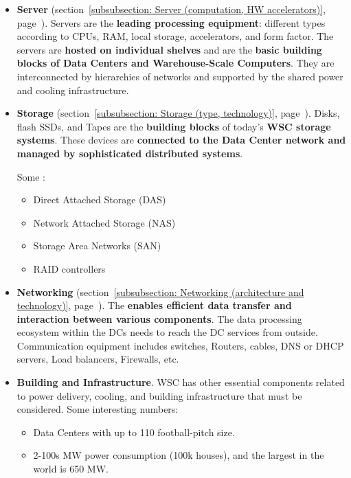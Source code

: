 \begin{itemize}
    \item \textbf{Server} (section~\ref{subsubsection: Server (computation, HW accelerators)}, page~\pageref{subsubsection: Server (computation, HW accelerators)}). Servers are the \textbf{leading processing equipment}: different types according to CPUs, RAM, local storage, accelerators, and form factor. The servers are \textbf{hosted on individual shelves} and are the \textbf{basic building blocks of Data Centers and Warehouse-Scale Computers}. They are interconnected by hierarchies of networks and supported by the shared power and cooling infrastructure.

    \item \textbf{Storage} (section~\ref{subsubsection: Storage (type, technology)}, page~\pageref{subsubsection: Storage (type, technology)}). Disks, flash SSDs, and Tapes are the \textbf{building blocks} of today's \textbf{WSC storage systems}. These devices are \textbf{connected to the Data Center network and managed by sophisticated distributed systems}.
    
    Some :
    \begin{itemize}
        \item Direct Attached Storage (DAS)

        \item Network Attached Storage (NAS)

        \item Storage Area Networks (SAN)

        \item RAID controllers
    \end{itemize}

    \item \textbf{Networking} (section~\ref{subsubsection: Networking (architecture and technology)}, page~\pageref{subsubsection: Networking (architecture and technology)}). The  \textbf{enables efficient data transfer and interaction between various components}. The data processing ecosystem within the DCs needs to reach the DC services from outside.
    Communication equipment includes switches, Routers, cables, DNS or DHCP servers, Load balancers, Firewalls, etc.

    \item \textbf{Building and Infrastructure}. WSC has other essential components related to power delivery, cooling, and building infrastructure that must be considered. Some interesting numbers:
    \begin{itemize}
        \item Data Centers with up to 110 football-pitch size.
        
        \item 2-100s MW power consumption (100k houses), and the largest in the world is 650 MW.
    \end{itemize}
\end{itemize}